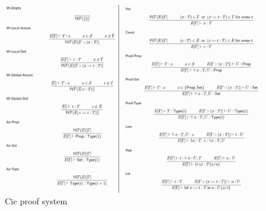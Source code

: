 \documentclass[letter,12pt]{amsart}
\begin{document}
%
\begin{figure}[t]
\includegraphics[width=\textwidth]{figs/coq_proof_system.png}
\caption{Cic proof system}
\label{fig:coq_proof_system}
\end{figure}
\end{document}
